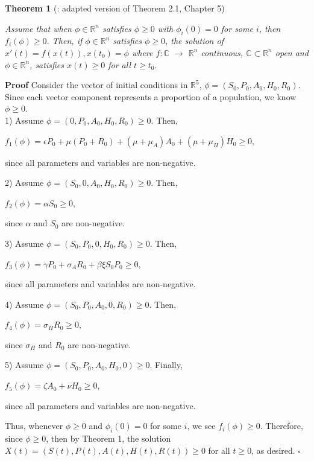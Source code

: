 \documentclass[12pt]{article}
\begin{document}
 \textbf{Theorem 1} (\cite{Smith}: adapted version of Theorem 2.1, Chapter 5) 

 \textit{Assume that when $\phi \in \mathbb{R}^n$ satisfies $\phi \geq 0$ with $\phi_{i}(0)=0$ for some $i$, then $f_i(\phi) \geq 0$. Then, if $\phi \in \mathbb{R}^n$ satisfies $\phi \geq 0$, the solution of $x'(t)=f(x(t)), x(t_{0})=\phi$ where $f: \mathbb{C}$ $\rightarrow$ $\mathbb{R}^n$ continuous, $\mathbb{C} \subset \mathbb{R}^n$ open and $\phi \in \mathbb{R}^n$, satisfies $x(t) \geq 0$ for all $t \geq t_{0}.$}
 
 \textbf{Proof} Consider the vector of initial conditions in $\mathbb{R}^5$, $\phi = (S_0, P_0, A_0, H_0, R_0).$ Since each vector component represents a proportion of a population, we know $\phi \geq 0.$ \\
 
1) Assume $\phi = (0, P_0, A_0, H_0, R_0) \geq 0.$ Then, 
\begin{center}
$f_1(\phi)=\epsilon P_0 + \mu (P_0+R_0)+(\mu + \mu_A) A_0 + (\mu+\mu_H) H_0 \geq 0,$
\end{center}
since all parameters and variables are non-negative. 
 
2) Assume $\phi = (S_0, 0, A_0, H_0, R_0) \geq 0.$ Then, 
\begin{center}
$f_2(\phi)=\alpha S_0 \geq 0,$
\end{center}
since $\alpha$ and $S_0$ are non-negative. 

3) Assume $\phi = (S_0, P_0, 0, H_0, R_0) \geq 0.$ Then,
\begin{center}
$f_3(\phi)=\gamma P_0 +\sigma_A R_0 + \beta \xi S_0 P_0 \geq 0,$
\end{center}
since all parameters and variables are non-negative. 
 
4) Assume $\phi = (S_0, P_0, A_0, 0, R_0) \geq 0.$ Then,
\begin{center}
$f_4(\phi)=\sigma_H R_0 \geq 0,$
\end{center}
since $\sigma_H$ and $R_0$ are non-negative. 
 
5)  Assume $\phi = (S_0, P_0, A_0, H_0, 0) \geq 0.$ Finally,
\begin{center}
$f_5(\phi)=\zeta A_0 +\nu H_0 \geq 0,$
\end{center}
since all parameters and variables are non-negative. 

Thus, whenever $\phi \geq 0$ and $\phi_i(0)=0$ for some $i$, we see $f_i(\phi) \geq 0$. Therefore, since $\phi \geq 0$,  then by Theorem 1, the solution $X(t)=(S(t), P(t), A(t), H(t), R(t)) \geq 0$ for all $t \geq 0$, as desired. $\square$
\end{document}
